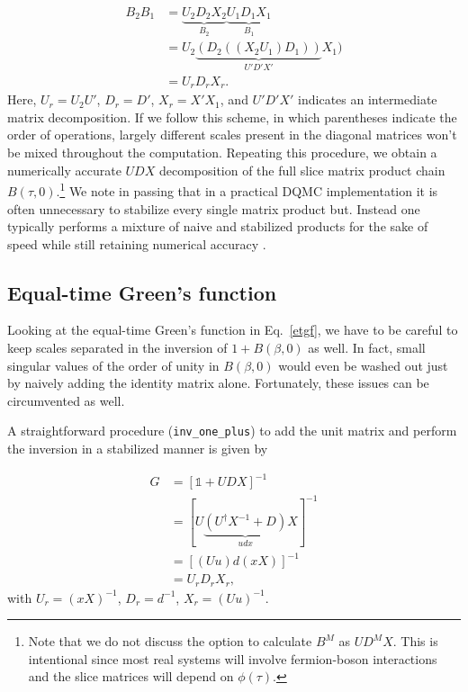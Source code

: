 \documentclass[%
 reprint,
superscriptaddress,
citeautoscript,
showpacs,
 amsmath,amssymb,
 aps,
 prb,
longbibliography,
]{revtex4-2}
\begin{document}
\begin{align}
B_2 B_1 &= \underbrace{U_2 D_2 X_2}_{B_2}\underbrace{U_1 D_1 X_1}_{B_1} \nonumber\\
&= U_2 \underbrace{(D_2 ((X_2 U_1) D_1))}_{U' D' X'} X_1)\\
&= U_r D_r X_r. \nonumber
\end{align}
Here, $U_r = U_2 U'$, $D_r = D'$, $X_r = X' X_1$, and $U'D'X'$ indicates an intermediate matrix decomposition. If we follow this scheme, in which parentheses indicate the order of operations, largely different scales present in the diagonal matrices won't be mixed throughout the computation. Repeating this procedure, we obtain a numerically accurate $UDX$ decomposition of the full slice matrix product chain $B(\tau, 0)$.\footnote{Note that we do not discuss the option to calculate $B^M$ as $U D^M X$. This is intentional since most real systems will involve fermion-boson interactions and the slice matrices will depend on $\phi(\tau)$.} We note in passing that in a practical DQMC implementation it is often unnecessary to stabilize every single matrix product but. Instead one typically performs a mixture of naive and stabilized products for the sake of speed while still retaining numerical accuracy \cite{Assaad2002a}.

\subsection{Equal-time Green's function}
Looking at the equal-time Green's function in Eq.~\ref{etgf}, we have to be careful to keep scales separated in the inversion of $1 + B(\beta, 0)$ as well. In fact, small singular values of the order of unity in $B(\beta, 0)$ would even be washed out just by naively adding the identity matrix alone. Fortunately, these issues can be circumvented as well.

A straightforward procedure (\texttt{inv\_one\_plus}) to add the unit matrix and perform the inversion in a stabilized manner is given by \cite{Santos2003, Assaad2002a}

\begin{align}
	G &= [\mathbb{1} + UDX]^{-1} \nonumber \\
	&= [U\underbrace{(U^\dagger X^{-1} + D)}_{udx}X]^{-1} \nonumber\\
	&= [(Uu)d(xX)]^{-1} \label{eq:inversion}\\
	&= U_r D_r X_r \nonumber,
\end{align}
with $U_r = (xX)^{-1}$, $D_r = d^{-1}$, $X_r = (Uu)^{-1}$.
\end{document}
